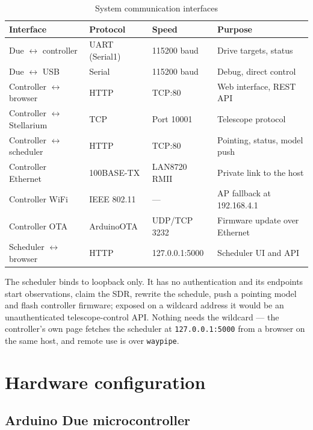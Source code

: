 \documentclass[11pt,a4paper]{article}
\begin{document}
\begin{table}[H]
\centering
\caption{System communication interfaces}
\label{tab:interfaces}
\small
\begin{tabular}{llll}
\toprule
\textbf{Interface} & \textbf{Protocol} & \textbf{Speed} & \textbf{Purpose} \\
\midrule
Due $\leftrightarrow$ controller & UART (Serial1) & 115200 baud & Drive targets, status \\
Due $\leftrightarrow$ USB & Serial & 115200 baud & Debug, direct control \\
Controller $\leftrightarrow$ browser & HTTP & TCP:80 & Web interface, REST API \\
Controller $\leftrightarrow$ Stellarium & TCP & Port 10001 & Telescope protocol \\
Controller $\leftrightarrow$ scheduler & HTTP & TCP:80 & Pointing, status, model push \\
Controller Ethernet & 100BASE-TX & LAN8720 RMII & Private link to the host \\
Controller WiFi & IEEE 802.11 & --- & AP fallback at 192.168.4.1 \\
Controller OTA & ArduinoOTA & UDP/TCP 3232 & Firmware update over Ethernet \\
Scheduler $\leftrightarrow$ browser & HTTP & 127.0.0.1:5000 & Scheduler UI and API \\
\bottomrule
\end{tabular}
\end{table}

The scheduler binds to loopback only. It has no authentication and its endpoints start observations, claim the SDR, rewrite the schedule, push a pointing model and flash controller firmware; exposed on a wildcard address it would be an unauthenticated telescope-control API. Nothing needs the wildcard --- the controller's own page fetches the scheduler at \texttt{127.0.0.1:5000} from a browser on the same host, and remote use is over \texttt{waypipe}.

\section{Hardware configuration}
\label{sec:hardware}

\subsection{Arduino Due microcontroller}
\end{document}
